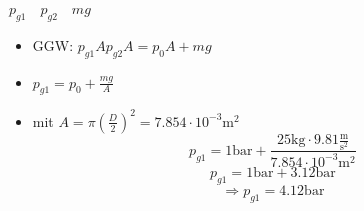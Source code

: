 

\item[a)] $p_{g1} \quad p_{g2} \quad mg$
    \begin{itemize}
        \item GGW: $p_{g1} A p_{g2} A = p_0 A + mg$
        \item $p_{g1} = p_0 + \frac{mg}{A}$
        \item mit $A = \pi \left( \frac{D}{2} \right)^2 = 7.854 \cdot 10^{-3} \text{m}^2$
        \[
        p_{g1} = 1 \text{bar} + \frac{25 \text{kg} \cdot 9.81 \frac{\text{m}}{\text{s}^2}}{7.854 \cdot 10^{-3} \text{m}^2}
        \]
        \[
        p_{g1} = 1 \text{bar} + 3.12 \text{bar}
        \]
        \[
        \Rightarrow p_{g1} = 4.12 \text{bar}
        \]
    \end{itemize}